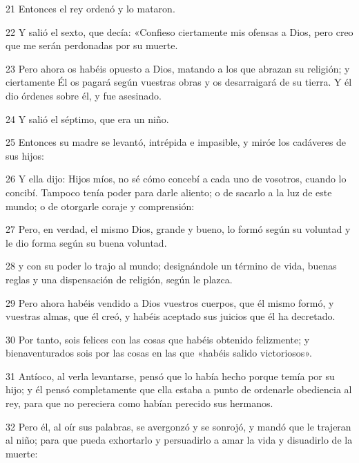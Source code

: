 \par 21 Entonces el rey ordenó y lo mataron.

\par 22 Y salió el sexto, que decía: «Confieso ciertamente mis ofensas a Dios, pero creo que me serán perdonadas por su muerte.

\par 23 Pero ahora os habéis opuesto a Dios, matando a los que abrazan su religión; y ciertamente Él os pagará según vuestras obras y os desarraigará de su tierra. Y él dio órdenes sobre él, y fue asesinado.

\par 24 Y salió el séptimo, que era un niño.

\par 25 Entonces su madre se levantó, intrépida e impasible, y miró¢ los cadáveres de sus hijos:

\par 26 Y ella dijo: Hijos míos, no sé cómo concebí a cada uno de vosotros, cuando lo concibí. Tampoco tenía poder para darle aliento; o de sacarlo a la luz de este mundo; o de otorgarle coraje y comprensión:

\par 27 Pero, en verdad, el mismo Dios, grande y bueno, lo formó según su voluntad y le dio forma según su buena voluntad.

\par 28 y con su poder lo trajo al mundo; designándole un término de vida, buenas reglas y una dispensación de religión, según le plazca.

\par 29 Pero ahora habéis vendido a Dios vuestros cuerpos, que él mismo formó, y vuestras almas, que él creó, y habéis aceptado sus juicios que él ha decretado.

\par 30 Por tanto, sois felices con las cosas que habéis obtenido felizmente; y bienaventurados sois por las cosas en las que «habéis salido victoriosos».

\par 31 Antíoco, al verla levantarse, pensó que lo había hecho porque temía por su hijo; y él pensó completamente que ella estaba a punto de ordenarle obediencia al rey, para que no pereciera como habían perecido sus hermanos.

\par 32 Pero él, al oír sus palabras, se avergonzó y se sonrojó, y mandó que le trajeran al niño; para que pueda exhortarlo y persuadirlo a amar la vida y disuadirlo de la muerte:

